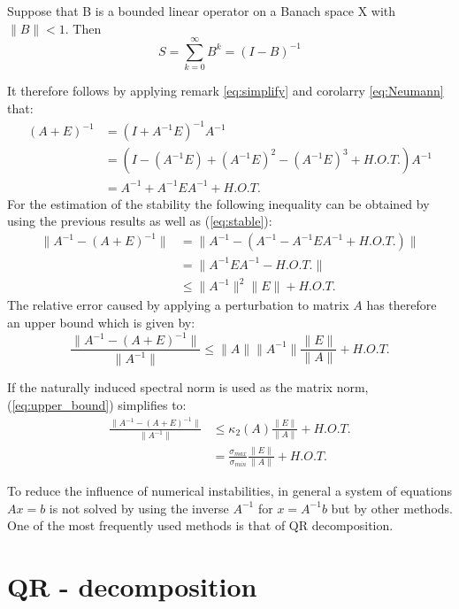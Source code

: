 \begin{corollary}\label{eq:Neumann}
	Suppose that B is a bounded linear operator on a Banach space X with $\lVert B \rVert < 1$. Then	
	\begin{equation}
		S = \sum_{k=0}^\infty B^k = (I-B)^{-1}
	\end{equation}  
\end{corollary}
It therefore follows by applying remark \ref{eq:simplify} and corolarry \ref{eq:Neumann} that:
\begin{align*}
	(A + E)^{-1} 	&= (I + A^{-1}E)^{-1}A^{-1} \\
					&= (I - (A^{-1}E) + (A^{-1}E)^2 - (A^{-1}E)^3 + H.O.T.) A^{-1} \\
					&= A^{-1} + A^{-1} E A^{-1} + H.O.T.
\end{align*}
 For the estimation of the stability the following inequality can be obtained by using the previous results as well as (\ref{eq:stable}):
\begin{align*}
	\lVert A^{-1} - (A + E)^{-1} \rVert & = \lVert A^{-1} - (A^{-1} - A^{-1}EA^{-1} + H.O.T.) \rVert \\
		& = \lVert A^{-1}EA^{-1} - H.O.T. \rVert \\
		& \leq \lVert A^{-1} \rVert^2 \lVert E \rVert +  H.O.T.
\end{align*}
The relative error caused by applying a perturbation to matrix $A$ has therefore an upper bound which is given by: 
\begin{equation}\label{eq:upper_bound}
 \frac{\lVert A^{-1} - (A + E)^{-1} \rVert}{\lVert A^{-1}\rVert} \leq \lVert A \rVert \lVert A^{-1} \rVert \frac{\lVert E \rVert}{\lVert A \rVert} + H.O.T.
\end{equation}

\begin{remark}
	If the naturally induced spectral norm is used as the matrix norm, (\ref{eq:upper_bound}) simplifies to:
	\begin{align*}
		\frac{\lVert A^{-1} - (A + E)^{-1} \rVert}{\lVert A^{-1}\rVert} & \leq \kappa_2(A) \frac{\lVert E \rVert}{\lVert A \rVert} + H.O.T. \\
		& = \frac{\sigma_{max}}{\sigma_{min}} \frac{\lVert E \rVert}{\lVert A \rVert} + H.O.T.
	\end{align*}
\end{remark}



To reduce the influence of numerical instabilities, in general a system of equations $Ax = b$ is not solved by using the inverse $A^{-1}$ for $x=A^{-1}b$ but by other methods. One of the most frequently used methods is that of QR decomposition.  

\section{QR - decomposition}

